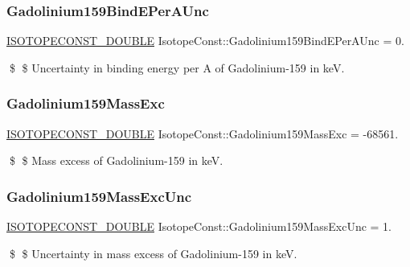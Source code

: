 \subsubsection{\texorpdfstring{Gadolinium159\+Bind\+E\+Per\+A\+Unc}{Gadolinium159BindEPerAUnc}}
{\footnotesize\ttfamily \mbox{\hyperlink{group___isotope_const-_macros_ga8f45a7272ce02c0b4c65c44636ed719a}{I\+S\+O\+T\+O\+P\+E\+C\+O\+N\+S\+T\+\_\+\+D\+O\+U\+B\+LE}} Isotope\+Const\+::\+Gadolinium159\+Bind\+E\+Per\+A\+Unc = 0.}

\$ \$ Uncertainty in binding energy per A of Gadolinium-\/159 in keV. \mbox{\label{group___isotope_const-_gadolinium-_gd159_ga2cdd3042f6fc842d1e5a5c69b83c3890}} 
\subsubsection{\texorpdfstring{Gadolinium159\+Mass\+Exc}{Gadolinium159MassExc}}
{\footnotesize\ttfamily \mbox{\hyperlink{group___isotope_const-_macros_ga8f45a7272ce02c0b4c65c44636ed719a}{I\+S\+O\+T\+O\+P\+E\+C\+O\+N\+S\+T\+\_\+\+D\+O\+U\+B\+LE}} Isotope\+Const\+::\+Gadolinium159\+Mass\+Exc = -\/68561.}

\$ \$ Mass excess of Gadolinium-\/159 in keV. \mbox{\label{group___isotope_const-_gadolinium-_gd159_ga611d2323419c07d3e646203fcb5d3ceb}} 
\subsubsection{\texorpdfstring{Gadolinium159\+Mass\+Exc\+Unc}{Gadolinium159MassExcUnc}}
{\footnotesize\ttfamily \mbox{\hyperlink{group___isotope_const-_macros_ga8f45a7272ce02c0b4c65c44636ed719a}{I\+S\+O\+T\+O\+P\+E\+C\+O\+N\+S\+T\+\_\+\+D\+O\+U\+B\+LE}} Isotope\+Const\+::\+Gadolinium159\+Mass\+Exc\+Unc = 1.}

\$ \$ Uncertainty in mass excess of Gadolinium-\/159 in keV. \mbox{\label{group___isotope_const-_gadolinium-_gd159_gacc130b20394afb6dfe41041a931baaf2}} 
